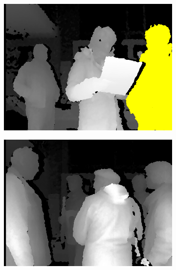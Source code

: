 \begin{figure}[H]
    \centering
    \begin{subfigure}[H]{0.32\textwidth}
        \centering
        \includegraphics[width=\textwidth]{Figures/8/non_inter_findings/effects/neglegance}
        \caption{}
        \label{fig:non-blindness}
    \end{subfigure}
    \begin{subfigure}[H]{0.32\textwidth}
        \centering
        \includegraphics[width=\textwidth]{Figures/8/non_inter_findings/effects/displayblindness}
        \caption{}
        \label{fig:non-negligence}
    \end{subfigure}
    \begin{subfigure}[H]{0.32\textwidth}

\end{subfigure}
\end{figure}
